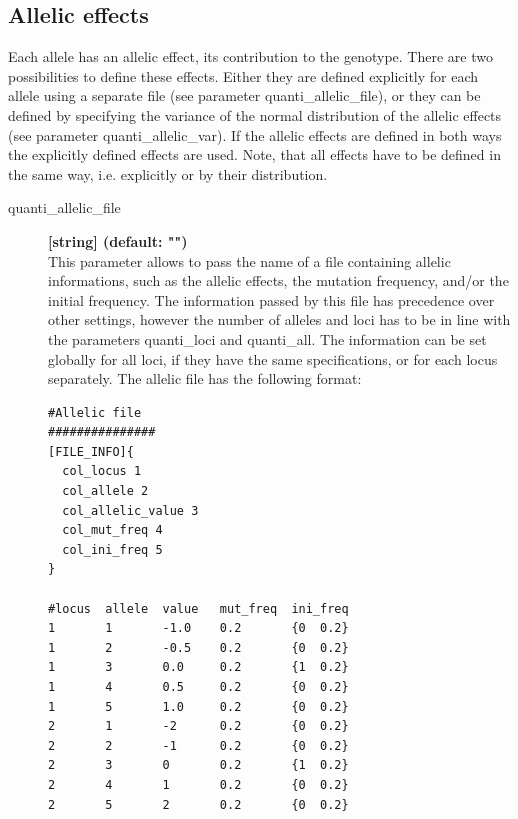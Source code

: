 \documentclass[letterpaper,12pt,oneside]{book}
\begin{document}
\subsection{Allelic effects}
Each allele has an allelic effect, its contribution to the genotype. There are two possibilities to define these effects. Either they are defined explicitly for each allele using a separate file (see parameter \textsf{quanti\_allelic\_file}), or they can be defined by specifying the variance of the normal distribution of the allelic effects (see parameter \textsf{quanti\_allelic\_var}). If the allelic effects are defined in both ways the explicitly defined effects are used. Note, that all effects have to be defined in the same way, i.e. explicitly or by their distribution.

\begin{description}
\item[\label{allelicFile}quanti\_allelic\_file]  \textbf{[string] (default: "")} \\
This parameter allows to pass the name of a file containing allelic informations, such as the allelic effects, the mutation frequency, and/or the initial frequency. The information passed by this file has precedence over other settings, however the number of alleles and loci has to be in line with the parameters \textsf{quanti\_loci} and \textsf{quanti\_all}. The information can be set globally for all loci, if they have the same specifications, or for each locus separately. The allelic file has the following format:

\begin{lstlisting}[frame=single]
#Allelic file 
###############
[FILE_INFO]{
  col_locus 1
  col_allele 2
  col_allelic_value 3
  col_mut_freq 4
  col_ini_freq 5
}

#locus  allele  value   mut_freq  ini_freq  
1       1       -1.0    0.2       {0  0.2}
1       2       -0.5    0.2       {0  0.2}
1       3       0.0     0.2       {1  0.2}
1       4       0.5     0.2       {0  0.2}
1       5       1.0     0.2       {0  0.2}
2       1       -2      0.2       {0  0.2}
2       2       -1      0.2       {0  0.2}
2       3       0       0.2       {1  0.2}
2       4       1       0.2       {0  0.2}
2       5       2       0.2       {0  0.2}
\end{lstlisting}


\end{description}
\end{document}
